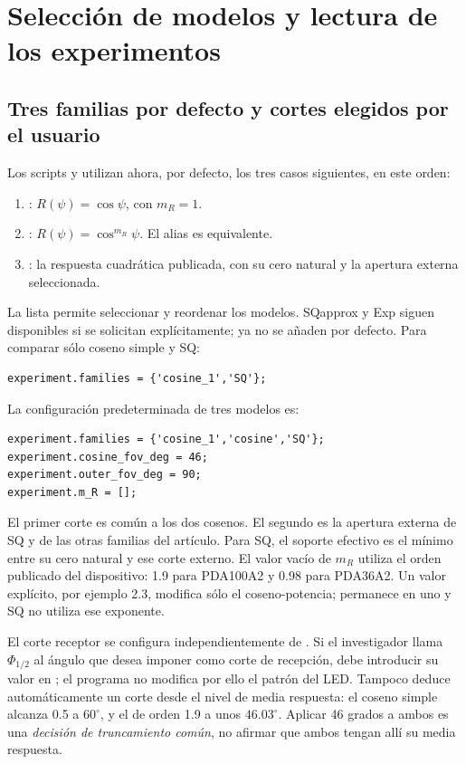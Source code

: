 \documentclass[11pt,a4paper]{article}
\begin{document}
\section{Selección de modelos y lectura de los experimentos}
\subsection{Tres familias por defecto y cortes elegidos por el usuario}
Los scripts  y  utilizan ahora, por defecto, los tres casos siguientes, en este orden:
\begin{enumerate}
\item {}: $R(\psi)=\cos\psi$, con $m_R=1$.
\item {}: $R(\psi)=\cos^{m_R}\psi$. El alias  es equivalente.
\item {}: la respuesta cuadrática publicada, con su cero natural y la apertura externa seleccionada.
\end{enumerate}
La lista  permite seleccionar y reordenar los modelos. SQapprox y Exp siguen disponibles si se solicitan explícitamente; ya no se añaden por defecto. Para comparar sólo coseno simple y SQ:
\begin{verbatim}
experiment.families = {'cosine_1','SQ'};
\end{verbatim}
La configuración predeterminada de tres modelos es:
\begin{verbatim}
experiment.families = {'cosine_1','cosine','SQ'};
experiment.cosine_fov_deg = 46;
experiment.outer_fov_deg = 90;
experiment.m_R = [];
\end{verbatim}
El primer corte es común a los dos cosenos. El segundo es la apertura externa de SQ y de las otras familias del artículo. Para SQ, el soporte efectivo es el mínimo entre su cero natural y ese corte externo. El valor vacío de $m_R$ utiliza el orden publicado del dispositivo: 1.9 para PDA100A2 y 0.98 para PDA36A2. Un valor explícito, por ejemplo 2.3, modifica sólo el coseno-potencia;  permanece en uno y SQ no utiliza ese exponente.

El corte receptor se configura independientemente de . Si el investigador llama $\Phi_{1/2}$ al ángulo que desea imponer como corte de recepción, debe introducir su valor en ; el programa no modifica por ello el patrón del LED. Tampoco deduce automáticamente un corte desde el nivel de media respuesta: el coseno simple alcanza 0.5 a $60^\circ$, y el de orden 1.9 a unos $46.03^\circ$. Aplicar 46 grados a ambos es una \emph{decisión de truncamiento común}, no afirmar que ambos tengan allí su media respuesta.
\end{document}
